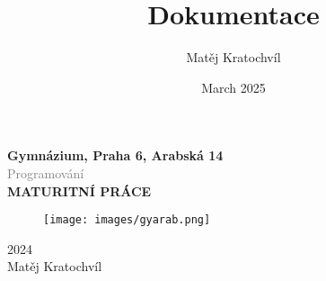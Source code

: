 \documentclass[12pt]{article}
\title{Dokumentace}
\author{Matěj Kratochvíl}
\date{March 2025}
\begin{document}
\begin{titlepage}
    \begin{center}
        \vspace*{1cm}

        {\LARGE \textbf{Gymnázium, Praha 6, Arabská 14}} \\
        \vspace{0.5cm}
        \textcolor{gray}{\large Programování}
        \vspace{2cm}\\
        {\LARGE \textbf{MATURITNÍ PRÁCE}}\\
        \vspace{2cm}
        \vspace{1.5cm}
        \begin{figure}[h]
            \centering
            \texttt{[image: images/gyarab.png]}
        \end{figure}
        \vfill
        \hspace{10cm} {\large 2024} \\
        \hspace{10cm} {\large Matěj Kratochvíl}
    \end{center}
\end{titlepage}
\end{document}
